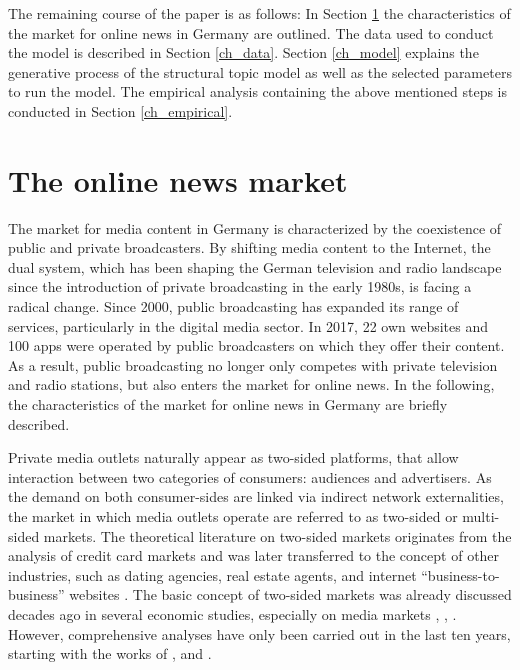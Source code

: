\documentclass[12pt,a4paper,notitlepage]{article}
\begin{document}
The remaining course of the paper is as follows: In Section \ref{ch_onlinenews} the characteristics of the market for online news in Germany are outlined. The data used to conduct the model is described in Section \ref{ch_data}. Section \ref{ch_model} explains the generative process of the structural topic model as well as the selected parameters to run the model. The empirical analysis containing the above mentioned steps is conducted in Section \ref{ch_empirical}. 
 
\section{The online news market}\label{ch_onlinenews}

The market for media content in Germany is characterized by the coexistence of public and private broadcasters. By shifting media content to the Internet, the dual system, which has been shaping the German television and radio landscape since the introduction of private broadcasting in the early 1980s, is facing a radical change. Since 2000, public broadcasting has expanded its range of services, particularly in the digital media sector. In 2017, 22 own websites and 100 apps were operated by public broadcasters on which they offer their content. As a result, public broadcasting no longer only competes with private television and radio stations, but also enters the market for online news. In the following, the characteristics of the market for online news in Germany are briefly described. 

Private media outlets naturally appear as two-sided platforms, that allow interaction between two categories of consumers: audiences and advertisers. As the demand on both consumer-sides are linked via indirect network externalities, the market in which media outlets operate are referred to as two-sided or multi-sided markets. The theoretical literature on two-sided markets originates from the analysis of credit card markets \citep{rochet_platform_2003} and was later transferred to the concept of other industries, such as dating agencies, real estate agents, and internet “business-to-business” websites \citep{caillaud_chicken_2003}. The basic concept of two-sided markets was already discussed decades ago in several economic studies, especially on media markets \citep{corden_maximisation_1952}, \citep{gustafsson_circulation_1978}, \citep{blair_pricing_1993}. However, comprehensive analyses have only been carried out in the last ten years, starting with the works of \citet{rochet_platform_2003}, \citet{evans_empirical_2003} and \citet{armstrong_competition_2006}.
\end{document}
